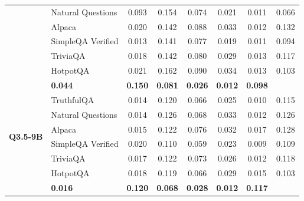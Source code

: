 \begin{table}[ht]
\begin{tabular}{ll cccccc}
        & Natural Questions \cite{kwiatkowski2019natural} & 0.093 & 0.154 & 0.074 & 0.021 & 0.011 & 0.066 \\
        & Alpaca \cite{taori2023stanford-alpaca} & 0.020 & 0.142 & 0.088 & 0.033 & 0.012 & 0.132 \\
        & SimpleQA Verified \cite{haas_simpleqa_2026} & 0.013 & 0.141 & 0.077 & 0.019 & 0.011 & 0.094 \\
        & TriviaQA \cite{joshi2017triviaqa} & 0.018 & 0.142 & 0.080 & 0.029 & 0.013 & 0.117 \\
        & HotpotQA \cite{yang2018hotpotqa} & 0.021 & 0.162 & 0.090 & 0.034 & 0.013 & 0.103 \\
        \rowcolor[gray]{.95} \multicolumn{2}{r}{\textbf{Total SGS}} & \textbf{0.044} & \textbf{0.150} & \textbf{0.081} & \textbf{0.026} & \textbf{0.012} & \textbf{0.098} \\
        \midrule
        \multirow{6}{*}{\textbf{Q3.5-9B}}
        & TruthfulQA \cite{lin2022truthfulqa} & 0.014 & 0.120 & 0.066 & 0.025 & 0.010 & 0.115 \\
        & Natural Questions \cite{kwiatkowski2019natural} & 0.014 & 0.126 & 0.068 & 0.033 & 0.012 & 0.126 \\
        & Alpaca \cite{taori2023stanford-alpaca} & 0.015 & 0.122 & 0.076 & 0.032 & 0.017 & 0.128 \\
        & SimpleQA Verified \cite{haas_simpleqa_2026} & 0.020 & 0.110 & 0.059 & 0.023 & 0.009 & 0.109 \\
        & TriviaQA \cite{joshi2017triviaqa} & 0.017 & 0.122 & 0.073 & 0.026 & 0.012 & 0.118 \\
        & HotpotQA \cite{yang2018hotpotqa} & 0.018 & 0.119 & 0.066 & 0.029 & 0.015 & 0.103 \\
        \rowcolor[gray]{.95} \multicolumn{2}{r}{\textbf{Total SGS}} & \textbf{0.016} & \textbf{0.120} & \textbf{0.068} & \textbf{0.028} & \textbf{0.012} & \textbf{0.117} \\
        \bottomrule
    \end{tabular}
\end{table}
